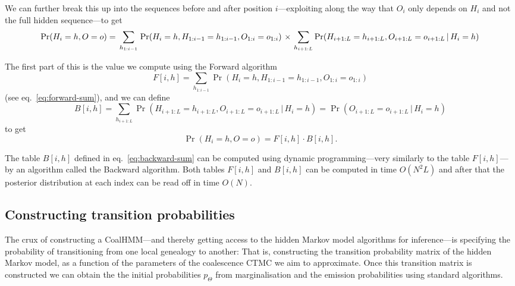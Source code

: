 We can further break this up into the sequences before and after position $i$---exploiting along the way that $O_i$ only depends on $H_i$ and not the full hidden sequence---to get
\begin{dmath*}
    \Pr(H_i=h,O=o) = \\
    \sum_{h_{1:i-1}}
    \left.
        \Pr(H_i=h, H_{1:i-1}=h_{1:i-1},O_{1:i}=o_{1:i})
    \right.
    \times 
    \left.
        \sum_{h_{i+1:L}} \Pr(H_{i+1:L}=h_{i+1:L}, O_{i+1:L}=o_{i+1:L}\,|\,H_i=h)
    \right.
\end{dmath*}

The first part of this is the value we compute using the Forward algorithm
\begin{displaymath}
    F[i,h] = \sum_{h_{1:i-1}} \Pr(H_i=h, H_{1:i-1}=h_{1:i-1},O_{1:i}=o_{1:i})
\end{displaymath}
(see eq.~\eqref{eq:forward-sum}), and we can define
\begin{dmath}
\label{eq:backward-sum}
  B[i,h] = 
  \sum_{h_{i+1:L}} 
      \left.\Pr\left(H_{i+1:L}=h_{i+1:L}, O_{i+1:L}=o_{i+1:L}\,|\,H_i=h\right)\right.
  = \left.\Pr\left(O_{i+1:L}=o_{i+1:L}\,|\,H_i=h\right)\right.
\end{dmath}
to get
\begin{displaymath}
  \Pr(H_i=h,O=o) = F[i,h] \cdot B[i,h].
\end{displaymath}

The table $B[i,h]$ defined in eq.~\eqref{eq:backward-sum} can be computed using dynamic programming---very similarly to the table $F[i,h]$---by an algorithm called the Backward algorithm. Both tables $F[i,h]$ and $B[i,h]$ can be computed in time $O(N^2L)$ and after that the posterior distribution at each index can be read off in time $O(N)$.


\subsection{Constructing transition probabilities}

The crux of constructing a CoalHMM---and thereby getting access to the hidden Markov model algorithms for inference---is specifying the probability of transitioning from one local genealogy to another: That is, constructing the transition probability matrix of the hidden Markov model, as a function of the parameters of the coalescence CTMC we aim to approximate. Once this transition matrix is constructed we can obtain the the initial probabilities $p_\Theta$ from marginalisation and the emission probabilities using standard algorithms.

